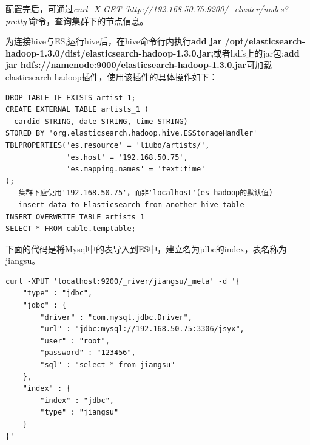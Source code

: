 配置完后，可通过\textsl{curl -X GET 'http://192.168.50.75:9200/\_cluster/nodes?pretty'}命令，查询集群下的节点信息。
\par 为连接hive与ES,运行hive后，在hive命令行内执行\textbf{add jar /opt/elasticsearch-hadoop-1.3.0/dist/elasticsearch-hadoop-1.3.0.jar;}或者hdfs上的jar包:\textbf{add jar hdfs://namenode:9000/elasticsearch-hadoop-1.3.0.jar}可加载elasticsearch-hadoop插件，使用该插件的具体操作如下：
\begin{verbatim}
DROP TABLE IF EXISTS artist_1;
CREATE EXTERNAL TABLE artists_1 (
  cardid STRING, date STRING, time STRING)
STORED BY 'org.elasticsearch.hadoop.hive.ESStorageHandler'
TBLPROPERTIES('es.resource' = 'liubo/artists/',
              'es.host' = '192.168.50.75',
              'es.mapping.names' = 'text:time'
);
-- 集群下应使用'192.168.50.75'，而非'localhost'(es-hadoop的默认值)
-- insert data to Elasticsearch from another hive table
INSERT OVERWRITE TABLE artists_1
SELECT * FROM cable.temptable;
\end{verbatim}
\par 下面的代码是将Mysql中的表导入到ES中，建立名为jdbc的index，表名称为jiangsu。
\begin{verbatim}
curl -XPUT 'localhost:9200/_river/jiangsu/_meta' -d '{
    "type" : "jdbc",
    "jdbc" : {
        "driver" : "com.mysql.jdbc.Driver",
        "url" : "jdbc:mysql://192.168.50.75:3306/jsyx",
        "user" : "root",
        "password" : "123456",
        "sql" : "select * from jiangsu"
    },
    "index" : {
        "index" : "jdbc",
        "type" : "jiangsu"
    }
}'
\end{verbatim}
